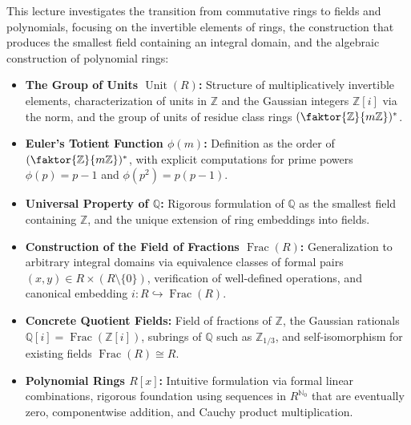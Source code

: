 

\begin{overview}
This lecture investigates the transition from commutative rings to fields and polynomials, focusing on the invertible elements of rings, the construction that produces the smallest field containing an integral domain, and the algebraic construction of polynomial rings:
\begin{itemize}
    \item \textbf{The Group of Units $\operatorname{Unit}(R)$:} Structure of multiplicatively invertible elements, characterization of units in $\mathbb{Z}$ and the Gaussian integers $\mathbb{Z}[i]$ via the norm, and the group of units of residue class rings $(\faktor{\mathbb{Z}}{m\mathbb{Z}})^*$.
    \item \textbf{Euler's Totient Function $\phi(m)$:} Definition as the order of $(\faktor{\mathbb{Z}}{m\mathbb{Z}})^*$, with explicit computations for prime powers $\phi(p) = p-1$ and $\phi(p^2) = p(p-1)$.
    \item \textbf{Universal Property of $\mathbb{Q}$:} Rigorous formulation of $\mathbb{Q}$ as the smallest field containing $\mathbb{Z}$, and the unique extension of ring embeddings into fields.
    \item \textbf{Construction of the Field of Fractions $\operatorname{Frac}(R)$:} Generalization to arbitrary integral domains via equivalence classes of formal pairs $(x, y) \in R \times (R \setminus \{0\})$, verification of well-defined operations, and canonical embedding $i \colon R \hookrightarrow \operatorname{Frac}(R)$.
    \item \textbf{Concrete Quotient Fields:} Field of fractions of $\mathbb{Z}$, the Gaussian rationals $\mathbb{Q}[i] = \operatorname{Frac}(\mathbb{Z}[i])$, subrings of $\mathbb{Q}$ such as $\mathbb{Z}_{1/3}$, and self-isomorphism for existing fields $\operatorname{Frac}(R) \cong R$.
    \item \textbf{Polynomial Rings $R[x]$:} Intuitive formulation via formal linear combinations, rigorous foundation using sequences in $R^{\mathbb{N}_0}$ that are eventually zero, componentwise addition, and Cauchy product multiplication.
\end{itemize}
\end{overview}

